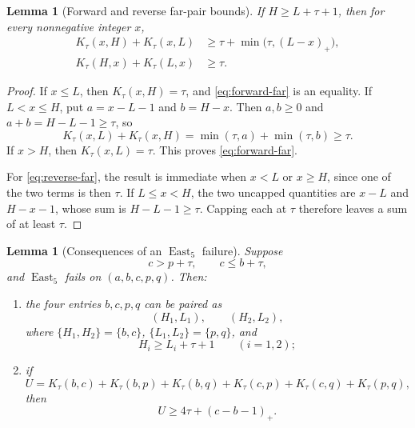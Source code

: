\documentclass[11pt]{article}
\newtheorem{lemma}[theorem]{Lemma}
\theoremstyle{definition}
\theoremstyle{remark}
\newcommand{\East}{\operatorname{East}}
\begin{document}
\begin{lemma}[Forward and reverse far-pair bounds]
\label{lem:far-pairs}
If \(H\ge L+\tau+1\), then for every nonnegative integer \(x\),
\begin{align}
  K_\tau(x,H)+K_\tau(x,L)
  &\ge \tau+\min\bigl(\tau,(L-x)_+\bigr),
  \label{eq:forward-far}\\
  K_\tau(H,x)+K_\tau(L,x)&\ge\tau.
  \label{eq:reverse-far}
\end{align}
\end{lemma}

\begin{proof}
If \(x\le L\), then \(K_\tau(x,H)=\tau\), and
\eqref{eq:forward-far} is an equality.  If \(L<x\le H\), put
\(a=x-L-1\) and \(b=H-x\).  Then \(a,b\ge0\) and
\(a+b=H-L-1\ge\tau\), so
\[
  K_\tau(x,L)+K_\tau(x,H)
  =\min(\tau,a)+\min(\tau,b)\ge\tau.
\]
If \(x>H\), then \(K_\tau(x,L)=\tau\).  This proves
\eqref{eq:forward-far}.

For \eqref{eq:reverse-far}, the result is immediate when \(x<L\) or
\(x\ge H\), since one of the two terms is then \(\tau\).  If
\(L\le x<H\), the two uncapped quantities are \(x-L\) and
\(H-x-1\), whose sum is \(H-L-1\ge\tau\).  Capping each at \(\tau\)
therefore leaves a sum of at least \(\tau\).
\end{proof}

\begin{lemma}[Consequences of an \(\East_5\) failure]
\label{lem:east5-consequences}
Suppose
\[
  c>p+\tau,
  \qquad c\le b+\tau,
\]
and \(\East_5\) fails on \((a,b,c,p,q)\).  Then:
\begin{enumerate}[label=\textup{(\roman*)}]
  \item the four entries \(b,c,p,q\) can be paired as
  \[
    (H_1,L_1),\qquad(H_2,L_2),
  \]
  where \(\{H_1,H_2\}=\{b,c\}\),
  \(\{L_1,L_2\}=\{p,q\}\), and
  \[
    H_i\ge L_i+\tau+1\qquad(i=1,2);
  \]
  \item if
  \[
    U=K_\tau(b,c)+K_\tau(b,p)+K_\tau(b,q)
      +K_\tau(c,p)+K_\tau(c,q)+K_\tau(p,q),
  \]
  then
  \begin{equation}
    U\ge4\tau+(c-b-1)_+.
    \label{eq:internal-U}
  \end{equation}
\end{enumerate}
\end{lemma}
\end{document}
